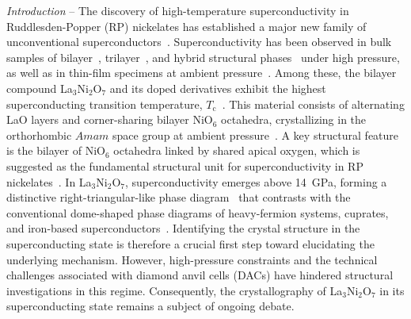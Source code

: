 \documentclass[prx,aps,twocolumn,preprintnumbers,amsmath,amssymb,superscriptaddress,showpacs]{revtex4-2}
\begin{document}
{\it Introduction} -- The discovery of high-temperature superconductivity in Ruddlesden-Popper (RP) nickelates has established a major new family of unconventional superconductors~\cite{Wang2024nor,Wang2025r}. Superconductivity has been observed in bulk samples of bilayer~\cite{Sun2023,Zhang2024h,Hou2023}, trilayer~\cite{Zhu2024s}, and hybrid structural phases~\cite{Shi2025s,Huang2025s} under high pressure, as well as in thin-film specimens at ambient pressure~\cite{Ko2025,Zhou2025a}. Among these, the bilayer compound La$_3$Ni$_2$O$_7$ and its doped derivatives exhibit the highest superconducting transition temperature, $T_\text{c}$~\cite{Li2025a,Zhong2025ev,Qiu2025i}. This material consists of alternating LaO layers and corner-sharing bilayer NiO$_6$ octahedra, crystallizing in the orthorhombic $Amam$ space group at ambient pressure~\cite{Sun2023, Li2025i, Zhang2024h, Wang2025c, Wang2024s, Zhang2024eff}. A key structural feature is the bilayer of NiO$_6$ octahedra linked by shared apical oxygen, which is suggested as the fundamental structural unit for superconductivity in RP nickelates~\cite{luo2023b,yang2024o,liu2024e,qu2024,Lu2024i1,Sakakibara2024p,Zhang2024str,Jiang2025t,Yang2023i,Lechermann2023}. In La$_3$Ni$_2$O$_7$, superconductivity emerges above 14~GPa, forming a distinctive right-triangular-like phase diagram~\cite{Li2025i} that contrasts with the conventional dome-shaped phase diagrams of heavy-fermion systems, cuprates, and iron-based superconductors~\cite{Crawford2005,Zhang2015Effects, Massidda2016, Medvedev2009E}. Identifying the crystal structure in the superconducting state is therefore a crucial first step toward elucidating the underlying mechanism. However, high-pressure constraints and the technical challenges associated with diamond anvil cells (DACs) have hindered structural investigations in this regime. Consequently, the crystallography of La$_3$Ni$_2$O$_7$ in its superconducting state remains a subject of ongoing debate.
\end{document}

